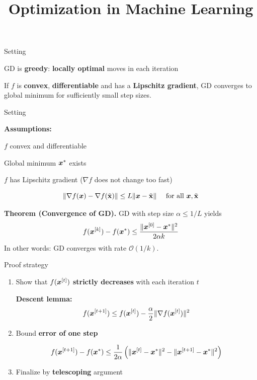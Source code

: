 \documentclass[11pt,compress,t,notes=noshow, xcolor=table]{beamer}
\title{Optimization in Machine Learning}
\begin{document}

\begin{framei}[sep=L]{Setting}
\item GD is \textbf{greedy}: \textbf{locally optimal} moves in each iteration
\item If $f$ is \textbf{convex}, \textbf{differentiable} and has a \textbf{Lipschitz gradient}, GD converges to global minimum for sufficiently small step sizes.
\vfill
{}
\end{framei}


\begin{framei}{Setting}
\item\textbf{Assumptions:}
\begin{itemizeM}
\item $f$ convex and differentiable
\item Global minimum $\bm{x}^\ast$ exists
\item $f$ has Lipschitz gradient ($\nabla f$ does not change too fast)
\begin{framed}
$$\| \nabla f(\bm{x}) - \nabla f(\tilde{\mathbf{x}}) \| \le L \|\bm{x} - \tilde{\mathbf{x}}\| \quad \text{ for all $\bm{x}, \tilde{\mathbf{x}}$}$$
\end{framed}
\end{itemizeM}
\begin{framed}
\textbf{Theorem \textnormal{(Convergence of GD)}.}
GD with step size $\alpha \leq 1/L$ yields
$$f(\bm{x}^{[k]}) - f(\bm{x}^\ast) \leq \frac{\| \bm{x}^{[0]} - \bm{x}^\ast \|^2}{2\alpha k}$$
In other words: GD converges with rate $\mathcal{O}(1/k)$.
\end{framed}
\end{framei}


\begin{framev}{Proof strategy}
\begin{enumerate}
\item Show that $f(\bm{x}^{[t]})$ \textbf{strictly decreases} with each iteration $t$
\begin{framed}
\textbf{Descent lemma:}
$$f(\bm{x}^{[t+1]}) \le f(\bm{x}^{[t]}) - \frac{\alpha}{2} \|\nabla f(\bm{x}^{[t]})\|^2$$
\end{framed}
\item Bound \textbf{error of one step}
\begin{framed}
$$f(\bm{x}^{[t+1]}) - f(\bm{x}^\ast) \leq \frac{1}{2 \alpha} \left( \|\bm{x}^{[t]}-\bm{x}^\ast\|^2 - \| \bm{x}^{[t+1]} - \bm{x}^\ast \|^2 \right)$$
\end{framed}
\item Finalize by \textbf{telescoping} argument
\end{enumerate}
\end{framev}
\end{document}
